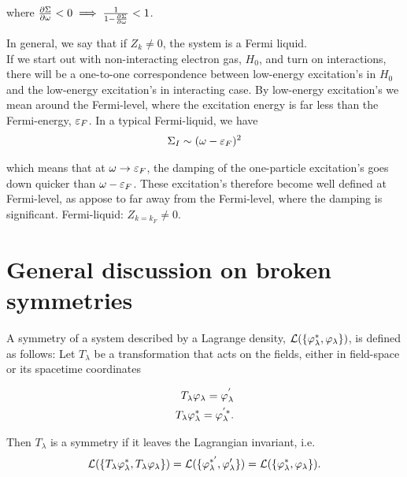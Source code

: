 where $\pdv{\Sigma}{\omega} < 0 \implies \frac{1}{1 - \pdv{\Sigma}{\omega}} < 1$. 

\begin{figure}
	\centering
	
\end{figure}

In general, we say that if $Z_k \neq 0$, the system is a Fermi liquid. \\ 

If we start out with non-interacting electron gas, $H_0$, and turn on interactions, there will be a one-to-one correspondence between low-energy excitation's in $H_0$ and the low-energy excitation's in interacting case. By low-energy excitation's we mean around the Fermi-level, where the excitation energy is far less than the Fermi-energy, $\varepsilon_F$. In a typical Fermi-liquid, we have \\ 

\begin{align*}
    \Sigma_I \sim (\omega - \varepsilon_F)^2 
\end{align*}

which means that at $\omega \to \varepsilon_F$, the damping of the one-particle excitation's goes down quicker than $\omega - \varepsilon_F$. These excitation's therefore become well defined at Fermi-level, as appose to far away from the Fermi-level, where the damping is significant. Fermi-liquid: $Z_{k = k_F} \neq 0$. \\

\section{General discussion on broken symmetries}

A symmetry of a system described by a Lagrange density, $\mathcal{L}(\{\varphi_\lambda^*, \varphi_\lambda\})$, is defined as follows: Let $T_\lambda$ be a transformation that acts on the fields, either in field-space or its spacetime coordinates

\begin{align*}
    T_\lambda \varphi_\lambda = \varphi_\lambda^{'} \\ 
    T_\lambda \varphi_\lambda^* = \varphi_\lambda^{'*}. 
\end{align*}

Then $T_\lambda$ is a symmetry if it leaves the Lagrangian invariant, i.e. \\ 

\begin{align*}
    \mathcal{L}(\{T_\lambda \varphi_\lambda^*, T_\lambda \varphi_\lambda\}) = \mathcal{L}(\{\varphi_\lambda^{*'}, \varphi_\lambda'\}) = \mathcal{L}(\{\varphi_\lambda^*, \varphi_\lambda\}).
\end{align*}

